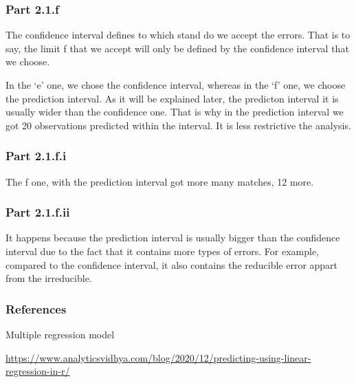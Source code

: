 \documentclass[
]{article}
\begin{document}
\hypertarget{part-2.1.f}{%
\subsubsection{Part 2.1.f}\label{part-2.1.f}}

The confidence interval defines to which stand do we accept the errors.
That is to say, the limit f that we accept will only be defined by the
confidence interval that we choose.

In the `e' one, we chose the confidence interval, whereas in the `f'
one, we choose the prediction interval. As it will be explained later,
the predicton interval it is usually wider than the confidence one. That
is why in the prediction interval we got 20 observations predicted
within the interval. It is less restrictive the analysis.

\hypertarget{part-2.1.f.i}{%
\subsubsection{Part 2.1.f.i}\label{part-2.1.f.i}}

The f one, with the prediction interval got more many matches, 12 more.

\hypertarget{part-2.1.f.ii}{%
\subsubsection{Part 2.1.f.ii}\label{part-2.1.f.ii}}

It happens because the prediction interval is usually bigger than the
confidence interval due to the fact that it contains more types of
errors. For example, compared to the confidence interval, it also
contains the reducible error appart from the irreducible.

\hypertarget{references}{%
\subsubsection{References}\label{references}}

Multiple regression model

\url{https://www.analyticsvidhya.com/blog/2020/12/predicting-using-linear-regression-in-r/}
\end{document}
